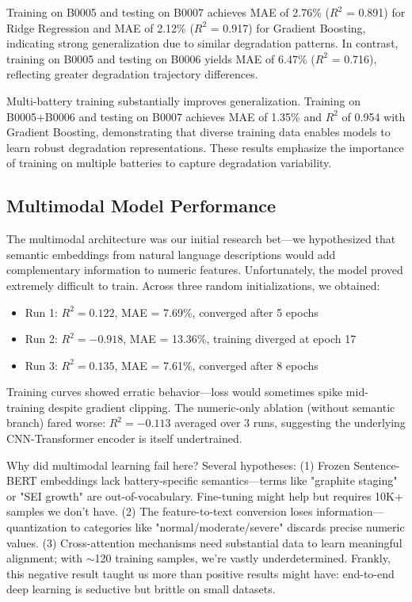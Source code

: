 \documentclass{sn-jnl}
\begin{document}
Training on B0005 and testing on B0007 achieves MAE of 2.76\% ($R^2$ = 0.891) for Ridge Regression and MAE of 2.12\% ($R^2$ = 0.917) for Gradient Boosting, indicating strong generalization due to similar degradation patterns. In contrast, training on B0005 and testing on B0006 yields MAE of 6.47\% ($R^2$ = 0.716), reflecting greater degradation trajectory differences.

Multi-battery training substantially improves generalization. Training on B0005+B0006 and testing on B0007 achieves MAE of 1.35\% and $R^2$ of 0.954 with Gradient Boosting, demonstrating that diverse training data enables models to learn robust degradation representations. These results emphasize the importance of training on multiple batteries to capture degradation variability.

\subsection{Multimodal Model Performance}
\label{subsec:multimodal_results}

The multimodal architecture was our initial research bet—we hypothesized that semantic embeddings from natural language descriptions would add complementary information to numeric features. Unfortunately, the model proved extremely difficult to train. Across three random initializations, we obtained:
\begin{itemize}
\item Run 1: $R^2 = 0.122$, MAE = 7.69\%, converged after 5 epochs
\item Run 2: $R^2 = -0.918$, MAE = 13.36\%, training diverged at epoch 17
\item Run 3: $R^2 = 0.135$, MAE = 7.61\%, converged after 8 epochs
\end{itemize}

Training curves showed erratic behavior—loss would sometimes spike mid-training despite gradient clipping. The numeric-only ablation (without semantic branch) fared worse: $R^2 = -0.113$ averaged over 3 runs, suggesting the underlying CNN-Transformer encoder is itself undertrained. 

Why did multimodal learning fail here? Several hypotheses: (1) Frozen Sentence-BERT embeddings lack battery-specific semantics—terms like "graphite staging" or "SEI growth" are out-of-vocabulary. Fine-tuning might help but requires 10K+ samples we don't have. (2) The feature-to-text conversion loses information—quantization to categories like "normal/moderate/severe" discards precise numeric values. (3) Cross-attention mechanisms need substantial data to learn meaningful alignment; with $\sim$120 training samples, we're vastly underdetermined. Frankly, this negative result taught us more than positive results might have: end-to-end deep learning is seductive but brittle on small datasets.
\end{document}

